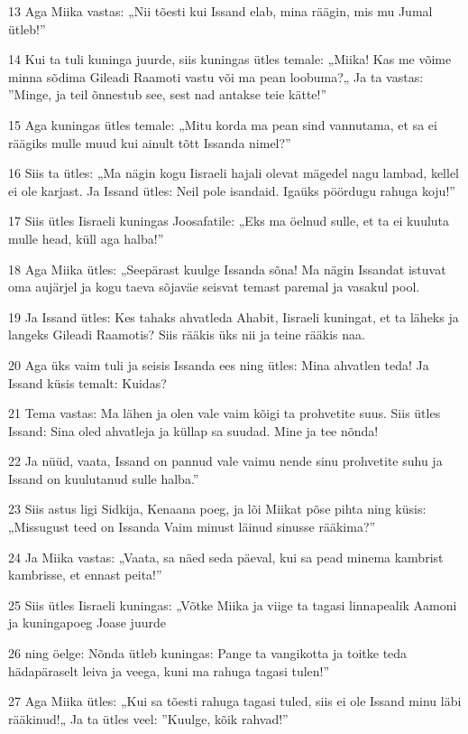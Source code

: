 \par 13 Aga Miika vastas: „Nii tõesti kui Issand elab, mina räägin, mis mu Jumal ütleb!”
\par 14 Kui ta tuli kuninga juurde, siis kuningas ütles temale: „Miika! Kas me võime minna sõdima Gileadi Raamoti vastu või ma pean loobuma?„ Ja ta vastas: ”Minge, ja teil õnnestub see, sest nad antakse teie kätte!”
\par 15 Aga kuningas ütles temale: „Mitu korda ma pean sind vannutama, et sa ei räägiks mulle muud kui ainult tõtt Issanda nimel?”
\par 16 Siis ta ütles: „Ma nägin kogu Iisraeli hajali olevat mägedel nagu lambad, kellel ei ole karjast. Ja Issand ütles: Neil pole isandaid. Igaüks pöördugu rahuga koju!”
\par 17 Siis ütles Iisraeli kuningas Joosafatile: „Eks ma öelnud sulle, et ta ei kuuluta mulle head, küll aga halba!”
\par 18 Aga Miika ütles: „Seepärast kuulge Issanda sõna! Ma nägin Issandat istuvat oma aujärjel ja kogu taeva sõjaväe seisvat temast paremal ja vasakul pool.
\par 19 Ja Issand ütles: Kes tahaks ahvatleda Ahabit, Iisraeli kuningat, et ta läheks ja langeks Gileadi Raamotis? Siis rääkis üks nii ja teine rääkis naa.
\par 20 Aga üks vaim tuli ja seisis Issanda ees ning ütles: Mina ahvatlen teda! Ja Issand küsis temalt: Kuidas?
\par 21 Tema vastas: Ma lähen ja olen vale vaim kõigi ta prohvetite suus. Siis ütles Issand: Sina oled ahvatleja ja küllap sa suudad. Mine ja tee nõnda!
\par 22 Ja nüüd, vaata, Issand on pannud vale vaimu nende sinu prohvetite suhu ja Issand on kuulutanud sulle halba.”
\par 23 Siis astus ligi Sidkija, Kenaana poeg, ja lõi Miikat põse pihta ning küsis: „Missugust teed on Issanda Vaim minust läinud sinusse rääkima?”
\par 24 Ja Miika vastas: „Vaata, sa näed seda päeval, kui sa pead minema kambrist kambrisse, et ennast peita!”
\par 25 Siis ütles Iisraeli kuningas: „Võtke Miika ja viige ta tagasi linnapealik Aamoni ja kuningapoeg Joase juurde
\par 26 ning öelge: Nõnda ütleb kuningas: Pange ta vangikotta ja toitke teda hädapäraselt leiva ja veega, kuni ma rahuga tagasi tulen!”
\par 27 Aga Miika ütles: „Kui sa tõesti rahuga tagasi tuled, siis ei ole Issand minu läbi rääkinud!„ Ja ta ütles veel: ”Kuulge, kõik rahvad!”
